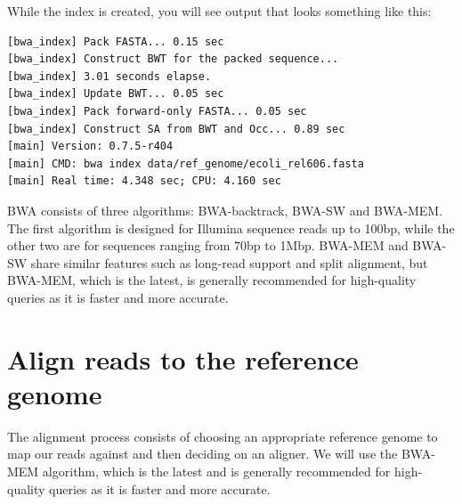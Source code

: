 \documentclass[
  letterpaper,
  DIV=11,
  numbers=noendperiod]{scrreprt}
\newenvironment{Shaded}{\begin{snugshade}}{\end{snugshade}}
\newcommand{\ExtensionTok}[1]{\textcolor[rgb]{0.00,0.23,0.31}{#1}}
\newcommand{\NormalTok}[1]{\textcolor[rgb]{0.00,0.23,0.31}{#1}}
\begin{document}
\begin{Shaded}
\end{Shaded}

While the index is created, you will see output that looks something
like this:

\begin{verbatim}
[bwa_index] Pack FASTA... 0.15 sec
[bwa_index] Construct BWT for the packed sequence...
[bwa_index] 3.01 seconds elapse.
[bwa_index] Update BWT... 0.05 sec
[bwa_index] Pack forward-only FASTA... 0.05 sec
[bwa_index] Construct SA from BWT and Occ... 0.89 sec
[main] Version: 0.7.5-r404
[main] CMD: bwa index data/ref_genome/ecoli_rel606.fasta
[main] Real time: 4.348 sec; CPU: 4.160 sec
\end{verbatim}

\begin{tcolorbox}[enhanced jigsaw, toptitle=1mm, breakable, bottomrule=.15mm, colback=white, toprule=.15mm, opacityback=0, bottomtitle=1mm, coltitle=black, opacitybacktitle=0.6, rightrule=.15mm, colframe=quarto-callout-note-color-frame, titlerule=0mm, colbacktitle=quarto-callout-note-color!10!white, title=\textcolor{quarto-callout-note-color}{\faInfo}\hspace{0.5em}{BWA alignment options}, left=2mm, leftrule=.75mm, arc=.35mm]

BWA consists of three algorithms: BWA-backtrack, BWA-SW and BWA-MEM. The
first algorithm is designed for Illumina sequence reads up to 100bp,
while the other two are for sequences ranging from 70bp to 1Mbp. BWA-MEM
and BWA-SW share similar features such as long-read support and split
alignment, but BWA-MEM, which is the latest, is generally recommended
for high-quality queries as it is faster and more accurate.

\end{tcolorbox}

\hypertarget{align-reads-to-the-reference-genome}{%
\section{Align reads to the reference
genome}\label{align-reads-to-the-reference-genome}}

The alignment process consists of choosing an appropriate reference
genome to map our reads against and then deciding on an aligner. We will
use the BWA-MEM algorithm, which is the latest and is generally
recommended for high-quality queries as it is faster and more accurate.
\end{document}
